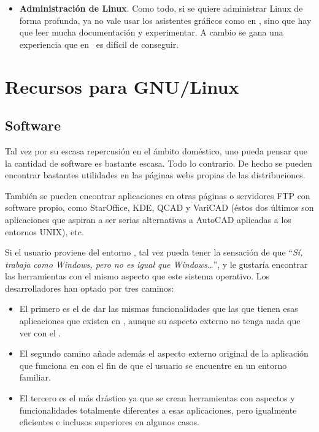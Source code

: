\begin{itemize}
\item  {\bf  Administración  de  Linux}.   Como  todo,  si  se  quiere
administrar Linux  de forma profunda,  ya no vale usar  los asistentes
gráficos como en \windows, sino que hay que leer mucha documentación y
experimentar. A  cambio se  gana una experiencia  que en  \windows\ es
difícil de conseguir.

\end{itemize}

\section{Recursos para GNU/Linux}

\subsection{Software}

Tal vez  por su escasa repercusión  en el ámbito doméstico,  uno pueda
pensar  que  la cantidad  de  software  es  bastante escasa.  Todo  lo
contrario. De  hecho se pueden  encontrar bastantes utilidades  en las
páginas webs propias de las distribuciones.

También se pueden encontrar aplicaciones en otras páginas o servidores
FTP con software propio, como  {\sf StarOffice}, {\sf KDE}, {\sf QCAD}
y {\sf VariCAD} (éstos dos últimos  son aplicaciones que aspiran a ser
serias alternativas  a {\sf AutoCAD}  aplicadas a los  entornos UNIX),
etc.

Si el  usuario proviene del entorno  \windows, tal vez pueda  tener la
sensación de que ``{\em Sí, trabaja como Windows, pero no es igual que
Windows\dots}'', y le gustaría encontrar las herramientas con el mismo
aspecto que este sistema operativo. Los desarrolladores han optado por
tres caminos:

\begin{itemize}

\item El primero  es el de dar las mismas  funcionalidades que las que
tienen esas  aplicaciones que existen  en \windows, aunque  su aspecto
externo no tenga nada que ver con el \windows.

\item El segundo camino añade además el aspecto externo original de la
aplicación que  funciona en \windows  con  el fin de que  el usuario se
encuentre en un entorno familiar.

\item El tercero  es el más drástico ya que  se crean herramientas con
aspectos y funcionalidades totalmente  diferentes a esas aplicaciones,
pero igualmente eficientes e inclusos superiores en algunos casos.

\end{itemize}

